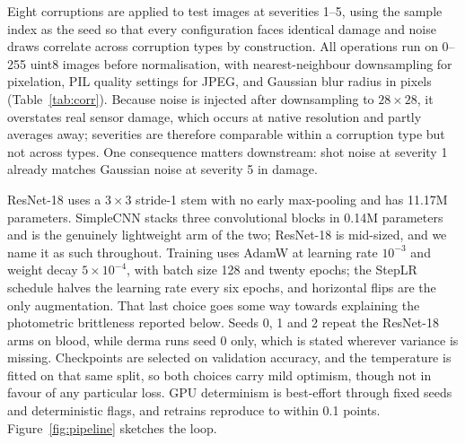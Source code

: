 \documentclass[a4paper,11pt,en,citestyle=authoryear,bibstyle=authoryear]{elegantpaper}
\begin{document}
Eight corruptions are applied to test images at severities 1--5, using the sample index as the seed so that every configuration faces identical damage and noise draws correlate across corruption types by construction. All operations run on 0--255 uint8 images before normalisation, with nearest-neighbour downsampling for pixelation, PIL quality settings for JPEG, and Gaussian blur radius in pixels (Table~\ref{tab:corr}). Because noise is injected after downsampling to $28\times28$, it overstates real sensor damage, which occurs at native resolution and partly averages away; severities are therefore comparable within a corruption type but not across types. One consequence matters downstream: shot noise at severity 1 already matches Gaussian noise at severity 5 in damage.

ResNet-18 uses a $3\times3$ stride-1 stem with no early max-pooling and has 11.17M parameters. SimpleCNN stacks three convolutional blocks in 0.14M parameters and is the genuinely lightweight arm of the two; ResNet-18 is mid-sized, and we name it as such throughout. Training uses AdamW \parencite{loshchilov2019} at learning rate $10^{-3}$ and weight decay $5\times10^{-4}$, with batch size 128 and twenty epochs; the StepLR schedule halves the learning rate every six epochs, and horizontal flips are the only augmentation. That last choice goes some way towards explaining the photometric brittleness reported below. Seeds 0, 1 and 2 repeat the ResNet-18 arms on blood, while derma runs seed 0 only, which is stated wherever variance is missing. Checkpoints are selected on validation accuracy, and the temperature is fitted on that same split, so both choices carry mild optimism, though not in favour of any particular loss. GPU determinism is best-effort through fixed seeds and deterministic flags, and retrains reproduce to within 0.1 points. Figure~\ref{fig:pipeline} sketches the loop.
\end{document}
